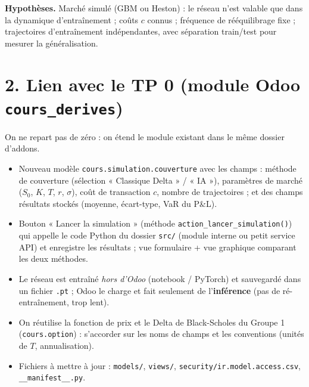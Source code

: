 \documentclass[10.5pt,a4paper]{article}
\begin{document}
\textbf{Hypothèses.} Marché simulé (GBM ou Heston) : le réseau n'est valable que dans la dynamique d'entraînement ; coûts $c$ connus ; fréquence de rééquilibrage fixe ; trajectoires d'entraînement indépendantes, avec séparation train/test pour mesurer la généralisation.

\section*{2. Lien avec le TP 0 (module Odoo \texttt{cours\_derives})}

On ne repart pas de zéro : on étend le module existant dans le même dossier d'addons.
\begin{itemize}
\item Nouveau modèle \texttt{cours.simulation.couverture} avec les champs : méthode de couverture (sélection « Classique Delta » / « IA »), paramètres de marché ($S_0$, $K$, $T$, $r$, $\sigma$), coût de transaction $c$, nombre de trajectoires ; et des champs résultats stockés (moyenne, écart-type, VaR du P\&L).
\item Bouton « Lancer la simulation » (méthode \texttt{action\_lancer\_simulation()}) qui appelle le code Python du dossier \texttt{src/} (module interne ou petit service API) et enregistre les résultats ; vue formulaire + vue graphique comparant les deux méthodes.
\item Le réseau est entraîné \emph{hors d'Odoo} (notebook / PyTorch) et sauvegardé dans un fichier \texttt{.pt} ; Odoo le charge et fait seulement de l'\textbf{inférence} (pas de ré-entraînement, trop lent).
\item On réutilise la fonction de prix et le Delta de Black-Scholes du Groupe 1 (\texttt{cours.option}) : s'accorder sur les noms de champs et les conventions (unités de $T$, annualisation).
\item Fichiers à mettre à jour : \texttt{models/}, \texttt{views/}, \texttt{security/ir.model.access.csv}, \texttt{\_\_manifest\_\_.py}.
\end{itemize}
\end{document}

